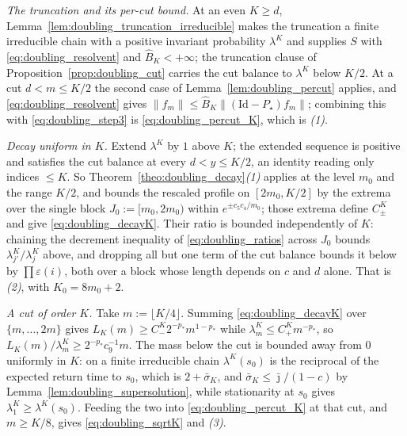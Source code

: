 \emph{The truncation and its per-cut bound.} At an even $K\geq d$,
Lemma~\ref{lem:doubling_truncation_irreducible} makes the truncation a finite irreducible chain
with a positive invariant probability $\lambda^K$ and supplies $S$ with
\eqref{eq:doubling_resolvent} and $\widehat B_K<+\infty$; the truncation clause of
Proposition~\ref{prop:doubling_cut} carries the cut balance to $\lambda^K$ below $K/2$. At a
cut $d<m\leq K/2$ the second case of Lemma~\ref{lem:doubling_percut} applies, and
\eqref{eq:doubling_resolvent} gives $\|f_m\|\leq\widehat B_K\|(\mathrm{Id}-P_\star)f_m\|$;
combining this with \eqref{eq:doubling_step3} is \eqref{eq:doubling_percut_K}, which is
\emph{(1)}.

\emph{Decay uniform in $K$.} Extend $\lambda^K$ by $1$ above $K$; the extended sequence is
positive and satisfies the cut balance at every $d<y\leq K/2$, an identity reading only indices
$\leq K$. So Theorem~\ref{theo:doubling_decay}\emph{(1)} applies at the level $m_0$ and the
range $K/2$, and bounds the rescaled profile on $[2m_0,K/2]$ by the extrema over the single
block $J_0:=[m_0,2m_0)$ within $e^{\pm c_5c_4/m_0}$; those extrema define $C^K_\pm$ and give
\eqref{eq:doubling_decayK}. Their ratio is bounded independently of $K$: chaining the
decrement inequality of \eqref{eq:doubling_ratios} across $J_0$ bounds
$\lambda^K_{j'}/\lambda^K_j$ above, and dropping all but one term of the cut balance bounds it
below by $\prod\varepsilon(i)$, both over a block whose length depends on $c$ and $d$ alone.
That is \emph{(2)}, with $K_0=8m_0+2$.

\emph{A cut of order $K$.} Take $m:=\lfloor K/4\rfloor$. Summing \eqref{eq:doubling_decayK}
over $\{m,\dots,2m\}$ gives $L_K(m)\geq C^K_-2^{-p_*}m^{1-p_*}$ while
$\lambda^K_m\leq C^K_+m^{-p_*}$, so $L_K(m)/\lambda^K_m\geq2^{-p_*}c_9^{-1}m$. The mass below
the cut is bounded away from $0$ uniformly in $K$: on a finite irreducible chain
$\lambda^K(s_0)$ is the reciprocal of the expected return time to $s_0$, which is
$2+\bar\sigma_K$, and $\bar\sigma_K\leq\bar\jmath/(1-c)$ by
Lemma~\ref{lem:doubling_supersolution}, while stationarity at $s_0$ gives
$\lambda^K_1\geq\lambda^K(s_0)$. Feeding the two into \eqref{eq:doubling_percut_K} at that cut,
and $m\geq K/8$, gives \eqref{eq:doubling_sqrtK} and \emph{(3)}.
